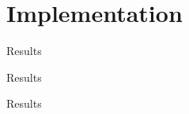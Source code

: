 \section{Implementation}

\begin{frame}{Results}{}
%  
\end{frame}



\begin{frame}{Results}{}
\end{frame}



\begin{frame}{Results}{}
\end{frame}

